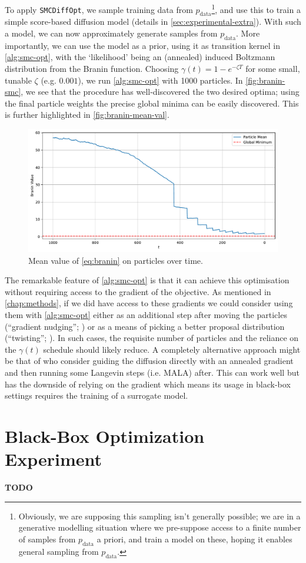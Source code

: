 To apply \texttt{SMCDiffOpt}, we sample training data from $p_{\text{data}}$\footnote{Obviously, we
are supposing this sampling isn't generally possible; we are in a generative modelling situation
where we pre-suppose access to a finite number of samples from $p_{\text{data}}$ a priori, and
train a model on these, hoping it enables general sampling from $p_{\text{data}}$.}, and use this
to train a simple score-based diffusion model (details in \autoref{sec:experimental-extra}). With such
a model, we can now approximately generate samples from $p_{\text{data}}$. More importantly, we can
use the model as a prior, using it as transition kernel in \autoref{alg:smc-opt}, with the `likelihood'
being an (annealed) induced Boltzmann distribution from the Branin function. Choosing
$\gamma(t) = 1 - e^{-\zeta T}$ for some small, tunable $\zeta$ (e.g. $0.001$), we run
\autoref{alg:smc-opt} with 1000 particles. In \autoref{fig:branin-smc}, we see that the procedure has
well-discovered the two desired optima; using the final particle weights the precise global minima
can be easily discovered. This is further highlighted in \autoref{fig:branin-mean-val}.

\begin{figure}[t]
    \centering
    \includegraphics[width=1\textwidth]{assets/smc_branin_mean_val.pdf}
    \caption{Mean value of \autoref{eq:branin} on particles over time.}
    \label{fig:branin-mean-val}
\end{figure}

The remarkable feature of \autoref{alg:smc-opt} is that it can achieve this optimisation without
requiring access to the gradient of the objective. As mentioned in \autoref{chap:methods}, if we did
have access to these gradients we could consider using them with \autoref{alg:smc-opt} either as an
additional step after moving the particles
(``gradient nudging''; \parencite{akyildizNudgingParticleFilter2020}) or as a means of picking a
better proposal distribution (``twisting''; \parencite{wuPracticalAsymptoticallyExact2023}). In
such cases, the requisite number of particles and the reliance on the $\gamma(t)$ schedule should
likely reduce. A completely alternative approach might be that of
\textcite{kongDiffusionModelsConstrained2024} who consider guiding the diffusion directly with an
annealed gradient and then running some Langevin steps (i.e. MALA) after. This can work well but has
the downside of relying on the gradient which means its usage in black-box settings requires the
training of a surrogate model.

\section{Black-Box Optimization Experiment} \label{sec:superconductor}

\textbf{TODO}
